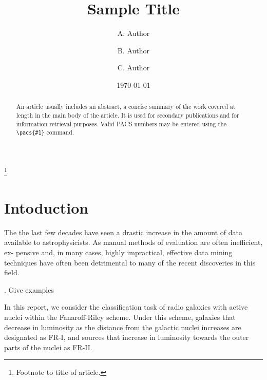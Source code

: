 \documentclass[%
 aip,
 jmp,%
 amsmath,amssymb,
 reprint,%
]{revtex4-1}
\begin{document}

\title[Sample title]{Sample Title}%
\thanks{Footnote to title of article.}

\author{A. Author}
\author{B. Author}%
%

\author{C. Author}
%

\date{\today}%

\begin{abstract}
An article usually includes an abstract, a concise summary of the work
covered at length in the main body of the article. It is used for
secondary publications and for information retrieval purposes. 
%
Valid PACS numbers may be entered using the \verb+\pacs{#1}+ command.
\end{abstract}


\maketitle


\section{\label{sec:level1}Intoduction}

The the last few decades have seen a drastic increase
in the amount of data available to astrophysicists. As
manual methods of evaluation are often inefficient, ex-
pensive and, in many cases, highly impractical, effective
data mining techniques have often been detrimental to
many of the recent discoveries in this field.

. Give examples

In this report, we consider the classification task of radio galaxies with active nuclei within the Fanaroff-Riley
scheme. Under this scheme, galaxies that decrease in luminosity as the distance from the galactic nuclei increases are designated as FR-I, and sources that increase in luminosity towards the outer parts of the nuclei as FR-II.
\end{document}
